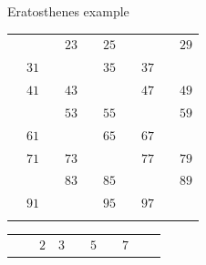 \documentclass{beamer}
\begin{document}
\begin{frame}[plain]{Eratosthenes example}
{\begin{tabular}{r r r r r r r r r r}
			                   &                    &                    & \color{black} $23$ &                    & \color{black} $25$ &                    &                    &                    & \color{black} $29$\\
			                   & \color{black} $31$ &                    &                    &                    & \color{black} $35$ &                    & \color{black} $37$ &                    &                   \\
			                   & \color{black} $41$ &                    & \color{black} $43$ &                    &                    &                    & \color{black} $47$ &                    & \color{black} $49$\\
			                   &                    &                    & \color{black} $53$ &                    & \color{black} $55$ &                    &                    &                    & \color{black} $59$\\
			                   & \color{black} $61$ &                    &                    &                    & \color{black} $65$ &                    & \color{black} $67$ &                    &                   \\
			                   & \color{black} $71$ &                    & \color{black} $73$ &                    &                    &                    & \color{black} $77$ &                    & \color{black} $79$\\
			                   &                    &                    & \color{black} $83$ &                    & \color{black} $85$ &                    &                    &                    & \color{black} $89$\\
			                   & \color{black} $91$ &                    &                    &                    & \color{black} $95$ &                    & \color{black} $97$ &                    &                   \\
			\phantom{$888$} & \phantom{$888$} & \phantom{$888$} & \phantom{$888$} & \phantom{$888$} & \phantom{$888$} & \phantom{$888$} & \phantom{$888$} & \phantom{$888$} & \phantom{$888$}
        \end{tabular}
	}
	 {
		\begin{tabular}{r r r r r r r r r r}
			                   &                    & \color{black}  $2$ & \color{black}  $3$ &                    & \color{ blue}  $5$ &                    & \color{black}  $7$ &                    &                   \\

\end{tabular}}
\end{frame}
\end{document}
